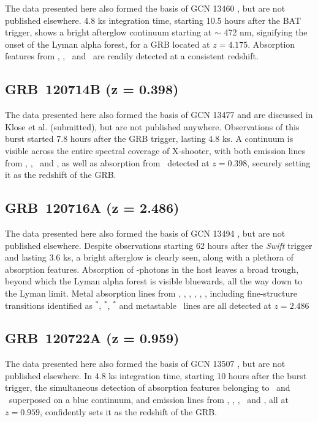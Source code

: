 \documentclass[longauth]{aa}    %
\begin{document}
The data presented here also formed the basis of GCN 13460 \citep{GCN13460}, but
are not published elsewhere. 4.8 ks integration time, starting 10.5 hours after
the BAT trigger, shows a bright afterglow continuum starting at $\sim$ 472 nm,
signifying the onset of the Lyman alpha forest, for a GRB located at $z =
4.175$. Absorption features from \lya, \feii, \mgii~and \SIii~are readily
detected at a consistent redshift.

\subsection{GRB~120714B (z = 0.398)} \label{120714}

The data presented here also formed the basis of GCN 13477 \citep{GCN13477} and
are discussed in Klose et al. (submitted), but are not published anywhere.
Observations of this burst started 7.8 hours after the GRB trigger, lasting 4.8
ks. A continuum is visible across the entire spectral coverage of X-shooter,
with both emission lines from  \oii, \hb, \oiii~and \ha, as well as absorption
from \mgii~detected at $z = 0.398$, securely setting it as the redshift of the
GRB.


\subsection{GRB~120716A (z = 2.486)} \label{120716}

The data presented here also formed the basis of GCN 13494 \citep{GCN13494}, but
are not published elsewhere. Despite observations starting 62 hours after the
\textit{Swift} trigger and lasting 3.6 ks, a bright afterglow is clearly seen,
along with a plethora of absorption features. Absorption of \lya-photons in the
host leaves a broad trough, beyond which the Lyman alpha forest is visible
bluewards, all the way down to the Lyman limit. Metal absorption lines from
\cii, \SIii, \oi, \feii, \civ, \SIiv, including fine-structure transitions
identified as \cii$^*$, \SIii$^*$, \feii$^*$ and metastable \NIii~lines are all
detected at $z = 2.486$


\subsection{GRB~120722A (z = 0.959)} \label{120722}

The data presented here also formed the basis of GCN 13507 \citep{GCN13507}, but
are not published elsewhere. In 4.8 ks integration time, starting 10 hours after
the burst trigger, the simultaneous detection of absorption features belonging
to \mgii~and \feii~superposed on a blue continuum, and emission lines from \oii,
\hg, \hb, \oiii~and \ha, all at $z = 0.959$, confidently sets it as the redshift
of the GRB.
\end{document}
